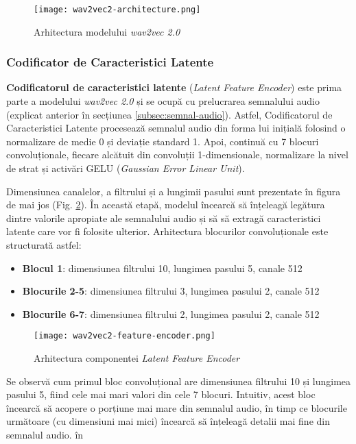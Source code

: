 \begin{figure}[h]
    \centering
    \texttt{[image: wav2vec2-architecture.png]}
    \caption{Arhitectura modelului \textit{wav2vec 2.0} \protect\footnotemark[2]}
    \label{fig:wav2vec2-architecture}
\end{figure}

\subsubsection{Codificator de Caracteristici Latente}
\textbf{Codificatorul de caracteristici latente} (\textit{Latent Feature Encoder}) este prima parte a modelului
\textit{wav2vec 2.0} și se ocupă cu prelucrarea semnalului audio (explicat anterior în secțiunea \ref{subsec:semnal-audio}).
Astfel, Codificatorul de Caracteristici Latente procesează semnalul audio din forma lui inițială folosind o 
normalizare de medie 0 și deviație standard 1. Apoi, continuă cu 7 blocuri convoluționale, fiecare alcătuit
din convoluții 1-dimensionale, normalizare la nivel de strat și activări GELU (\textit{Gaussian Error Linear Unit}).
\par
Dimensiunea canalelor, a filtrului și a lungimii pasului sunt prezentate în figura de mai jos
(Fig. \ref{fig:latent-feature-encoder}). În această etapă, modelul încearcă să înțeleagă legătura dintre
valorile apropiate ale semnalului audio și să să extragă caracteristici latente care vor fi folosite ulterior. Arhitectura
blocurilor convoluționale este structurată astfel:
\begin{itemize}
    \item \textbf{Blocul 1}: dimensiunea filtrului 10, lungimea pasului 5, canale 512
    \item \textbf{Blocurile 2-5}: dimensiunea filtrului 3, lungimea pasului 2, canale 512
    \item \textbf{Blocurile 6-7}: dimensiunea filtrului 2, lungimea pasului 2, canale 512
\end{itemize}


\vspace{-0.5em}
\begin{figure}[h]
    \centering
    \texttt{[image: wav2vec2-feature-encoder.png]}
    \caption{Arhitectura componentei \textit{Latent Feature Encoder} \protect\footnotemark[1]}
    \label{fig:latent-feature-encoder}
\end{figure}
\vspace{-0.5em}
\par
Se observă cum primul bloc convoluțional are dimensiunea filtrului 10 și lungimea pasului 5,
fiind cele mai mari valori din cele 7 blocuri. Intuitiv, acest bloc încearcă să acopere o porțiune
mai mare din semnalul audio, în timp ce blocurile următoare (cu dimensiuni mai mici) încearcă să
înțeleagă detalii mai fine din semnalul audio. în


